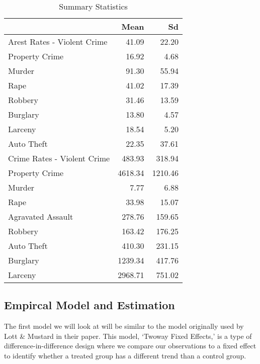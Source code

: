 \documentclass[
]{article}
\begin{document}
\begin{table}

\caption{\label{tab:unnamed-chunk-4}Summary Statistics}
\centering
\begin{tabular}[t]{l|r|r}
\hline
  & Mean & Sd\\
\hline
Arest Rates - Violent Crime & 41.09 & 22.20\\
\hline
Property Crime & 16.92 & 4.68\\
\hline
Murder & 91.30 & 55.94\\
\hline
Rape & 41.02 & 17.39\\
\hline
Robbery & 31.46 & 13.59\\
\hline
Burglary & 13.80 & 4.57\\
\hline
Larceny & 18.54 & 5.20\\
\hline
Auto Theft & 22.35 & 37.61\\
\hline
Crime Rates - Violent Crime & 483.93 & 318.94\\
\hline
Property Crime & 4618.34 & 1210.46\\
\hline
Murder & 7.77 & 6.88\\
\hline
Rape & 33.98 & 15.07\\
\hline
Agravated Assault & 278.76 & 159.65\\
\hline
Robbery & 163.42 & 176.25\\
\hline
Auto Theft & 410.30 & 231.15\\
\hline
Burglary & 1239.34 & 417.76\\
\hline
Larceny & 2968.71 & 751.02\\
\hline
\end{tabular}
\end{table}

\hypertarget{empircal-model-and-estimation}{%
\subsection{Empircal Model and
Estimation}\label{empircal-model-and-estimation}}

The first model we will look at will be similar to the model originally
used by Lott \& Mustard in their paper. This model, `Twoway Fixed
Effects,' is a type of difference-in-difference design where we compare
our observations to a fixed effect to identify whether a treated group
has a different trend than a control group.
\end{document}
